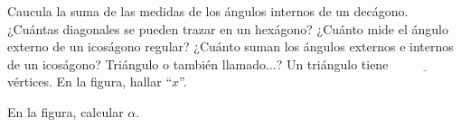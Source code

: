 Caucula la suma de las medidas de los \'angulos internos de un dec\'agono.
¿Cu\'antas diagonales se pueden trazar en un hex\'agono?
¿Cu\'anto mide el \'angulo externo de un icos\'agono regular?
¿Cu\'anto suman los \'angulos externos e internos de un icos\'agono?
Tri\'angulo o tambi\'en llamado...?
Un tri\'angulo tiene $\underline{\phantom{xxxxxxxxx}}$ v\'ertices.
En la figura, hallar ``$x$''.
\begin{center}
\end{center}
En la figura, calcular $\alpha$.
